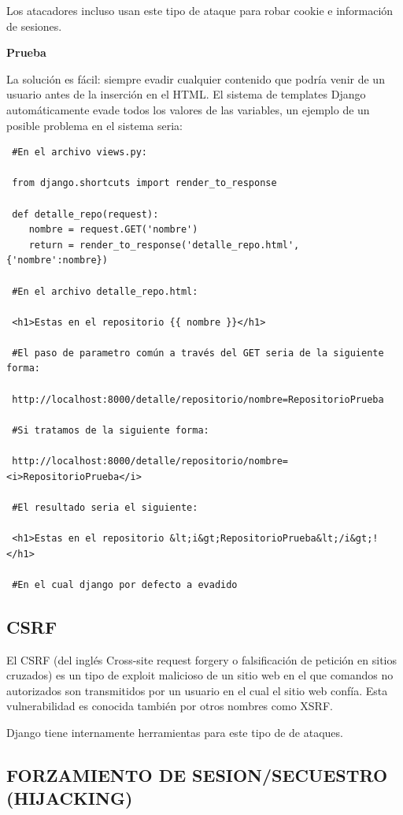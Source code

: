 Los atacadores incluso usan este tipo de ataque para robar cookie e información de sesiones.

\textbf{Prueba}

La solución es fácil: siempre evadir cualquier contenido que podría venir de un usuario antes de la inserción en el HTML. 
El sistema de templates Django automáticamente evade todos los valores de las variables, un ejemplo de un posible problema en el sistema seria:

\begin{verbatim}
 #En el archivo views.py:
 
 from django.shortcuts import render_to_response
 
 def detalle_repo(request):
 	nombre = request.GET('nombre')
	return = render_to_response('detalle_repo.html', {'nombre':nombre})

 #En el archivo detalle_repo.html:

 <h1>Estas en el repositorio {{ nombre }}</h1>

 #El paso de parametro común a través del GET seria de la siguiente forma: 

 http://localhost:8000/detalle/repositorio/nombre=RepositorioPrueba

 #Si tratamos de la siguiente forma:

 http://localhost:8000/detalle/repositorio/nombre=<i>RepositorioPrueba</i>

 #El resultado seria el siguiente:

 <h1>Estas en el repositorio &lt;i&gt;RepositorioPrueba&lt;/i&gt;!</h1>

 #En el cual django por defecto a evadido 

\end{verbatim}

\subsection{CSRF}

El CSRF (del inglés Cross-site request forgery o falsificación de petición en sitios cruzados) es un tipo de exploit malicioso de un sitio web en el que comandos no autorizados son transmitidos por un usuario en el cual el sitio web confía. Esta vulnerabilidad es conocida también por otros nombres como XSRF.

Django tiene internamente herramientas para este tipo de de ataques.

\subsection{FORZAMIENTO DE SESION/SECUESTRO (HIJACKING)}


